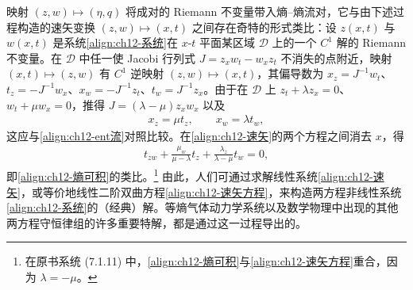 \documentclass[../../main.tex]{subfiles}
\begin{document}
映射 $(z,w)\mapsto(\eta,q)$ 将成对的 Riemann 不变量带入熵--熵流对，它与由下述过程构造的速矢变换 $(z,w)\mapsto(x,t)$ 之间存在奇特的形式类比：设 $z(x,t)$ 与 $w(x,t)$ 是系统\eqref{align:ch12-系统}在 $x$-$t$ 平面某区域 $\mathcal{D}$ 上的一个 $C^1$ 解的 Riemann 不变量。在 $\mathcal{D}$ 中任一使 Jacobi 行列式 $J=z_xw_t-w_xz_t$ 不消失的点附近，映射 $(x,t)\mapsto(z,w)$ 有 $C^1$ 逆映射 $(z,w)\mapsto(x,t)$，其偏导数为 $x_z=J^{-1}w_t$、$t_z=-J^{-1}w_x$、$x_w=-J^{-1}z_t$、$t_w=J^{-1}z_x$。由于在 $\mathcal{D}$ 上 $z_t+\lambda z_x=0$、$w_t+\mu w_x=0$，推得 $J=(\lambda-\mu)z_xw_x$ 以及
\begin{align}
x_z=\mu t_z,\qquad x_w=\lambda t_w,
\label{align:ch12-速矢}
\end{align}
这应与\eqref{align:ch12-ent流}对照比较。在\eqref{align:ch12-速矢}的两个方程之间消去 $x$，得
\begin{align}
t_{zw}+\frac{\mu_w}{\mu-\lambda}t_z+\frac{\lambda_z}{\lambda-\mu}t_w=0,
\label{align:ch12-速矢方程}
\end{align}
即\eqref{align:ch12-熵可积}的类比。\footnote{在原书系统 (7.1.11) 中，\eqref{align:ch12-熵可积}与\eqref{align:ch12-速矢方程}重合，因为 $\lambda=-\mu$。}
由此，人们可通过求解线性系统\eqref{align:ch12-速矢}，或等价地线性二阶双曲方程\eqref{align:ch12-速矢方程}，来构造两方程非线性系统\eqref{align:ch12-系统}的（经典）解。等熵气体动力学系统以及数学物理中出现的其他两方程守恒律组的许多重要特解，都是通过这一过程导出的。
\end{document}
